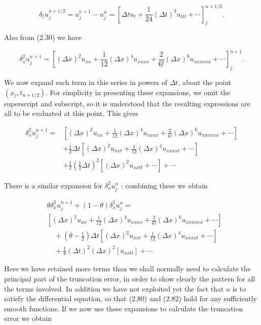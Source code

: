 \documentclass[10pt]{article}
\begin{document}
\[
\delta_{t} u_{j}^{n+1 / 2}=u_{j}^{n+1}-u_{j}^{n}=\left[\Delta t u_{t}+\frac{1}{24}(\Delta t)^{3} u_{t t t}+\cdots\right]_{j}^{n+1 / 2} .
\]

Also from (2.30) we have

\[
\delta_{x}^{2} u_{j}^{n+1}=\left[(\Delta x)^{2} u_{x x}+\frac{1}{12}(\Delta x)^{4} u_{x x x x}+\frac{2}{6!}(\Delta x)^{6} u_{x x x x x x}+\cdots\right]_{j}^{n+1} .
\]

We now expand each term in this series in powers of \(\Delta t\), about the point \(\left(x_{j}, t_{n+1 / 2}\right)\). For simplicity in presenting these expansions, we omit the superscript and subscript, so it is understood that the resulting expressions are all to be evaluated at this point. This gives

\[
\begin{aligned}
\delta_{x}^{2} u_{j}^{n+1}= & {\left[(\Delta x)^{2} u_{x x}+\frac{1}{12}(\Delta x)^{4} u_{x x x x}+\frac{2}{6!}(\Delta x)^{6} u_{x x x x x x}+\cdots\right] } \\
& +\frac{1}{2} \Delta t\left[(\Delta x)^{2} u_{x x t}+\frac{1}{12}(\Delta x)^{4} u_{x x x x t}+\cdots\right] \\
& +\frac{1}{2}\left(\frac{1}{2} \Delta t\right)^{2}\left[(\Delta x)^{2} u_{x x t t}+\cdots\right]+\cdots
\end{aligned}
\]

There is a similar expansion for \(\delta_{x}^{2} u_{j}^{n}\) : combining these we obtain

\[
\begin{aligned}
& \theta \delta_{x}^{2} u_{j}^{n+1}+(1-\theta) \delta_{x}^{2} u_{j}^{n}= \\
& {\left[(\Delta x)^{2} u_{x x}+\frac{1}{12}(\Delta x)^{4} u_{x x x x}+\frac{2}{6!}(\Delta x)^{6} u_{x x x x x x}+\cdots\right]} \\
& \quad+\left(\theta-\frac{1}{2}\right) \Delta t\left[(\Delta x)^{2} u_{x x t}+\frac{1}{12}(\Delta x)^{4} u_{x x x x t}+\cdots\right] \\
& \quad+\frac{1}{8}(\Delta t)^{2}(\Delta x)^{2}\left[u_{x x t t}\right]+\cdots
\end{aligned}
\]

Here we have retained more terms than we shall normally need to calculate the principal part of the truncation error, in order to show clearly the pattern for all the terms involved. In addition we have not exploited yet the fact that \(u\) is to satisfy the differential equation, so that (2.80) and (2.82) hold for any sufficiently smooth functions. If we now use these expansions to calculate the truncation error we obtain
\end{document}
